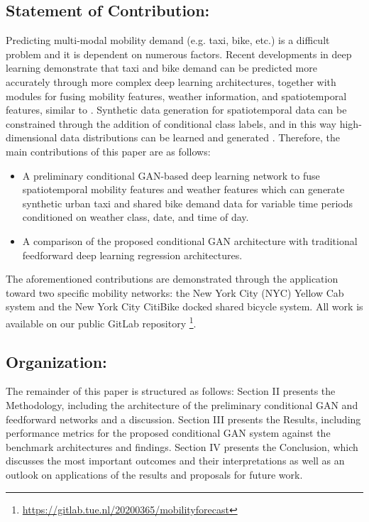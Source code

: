 \documentclass[conference]{IEEEtran}
\begin{document}
\subsection{Statement of Contribution:}
Predicting multi-modal mobility demand (e.g. taxi, bike, etc.) is a difficult problem and it is dependent on numerous 
factors. Recent developments in deep learning demonstrate that taxi and bike demand can be predicted more accurately 
through more complex deep learning architectures, together with modules for fusing mobility features, weather information, 
and spatiotemporal features, similar to \cite{zhou_predicting_2018} \cite{prado-rujas_combining_2023}. Synthetic data generation
 for spatiotemporal 
data can be constrained through the addition of conditional class labels, and in this way high-dimensional data distributions
can be learned and generated \cite{mirza_conditional_2014}. Therefore, the main contributions of this paper are as follows:

\begin{itemize}
  \item A preliminary conditional GAN-based deep learning network to fuse spatiotemporal mobility features and weather features 
which can generate synthetic urban taxi and shared bike demand data for variable time periods conditioned on weather class, 
date, and time of day.
  \item A comparison of the proposed conditional GAN architecture with traditional feedforward deep learning regression architectures.
\end{itemize}

The aforementioned contributions are demonstrated through the application toward two specific mobility networks: the New York 
City (NYC) Yellow Cab system and the New York City CitiBike docked shared bicycle system. All work is available on our public 
GitLab repository \footnote{\url{https://gitlab.tue.nl/20200365/mobilityforecast}}.

\subsection{Organization:}
The remainder of this paper is structured as follows: Section II presents the Methodology, including the architecture of the 
preliminary conditional GAN and feedforward networks and a discussion. Section III presents the Results, including performance 
metrics for the proposed conditional GAN system against the benchmark architectures and findings. Section IV presents the 
Conclusion, which discusses the most important outcomes and their interpretations as well as an outlook on applications of 
the results and proposals for future work.
\end{document}
